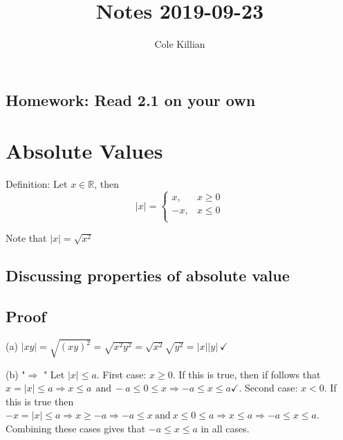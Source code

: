 \documentclass{article}
\begin{document}
\title{Notes 2019-09-23}
\author{Cole Killian}

\maketitle

\subsection{Homework: Read 2.1 on your own}

\section{Absolute Values}

Definition: Let $x \in \mathbb{R}$, then
\[|x| = 
  \begin{cases}
    x, & x \geq 0 \\
    -x, & x \leq 0 \\
  \end{cases}
\]

Note that $|x| = \sqrt{x^2}$

\subsection{Discussing properties of absolute value}


\subsection{Proof}

(a) $|xy| = \sqrt{(xy)^2} = \sqrt{x^2y^2} = \sqrt{x^2}\sqrt{y^2} = |x||y| \ \checkmark$

(b) "$\Rightarrow$ " Let $|x| \leq a$. First case: $x \geq 0$. If this is true, then if follows that $x = |x| \leq a \Rightarrow x \leq a \ \ \text{and} \ -a \leq 0 \leq x \Rightarrow -a \leq x \leq a \checkmark$. Second case: $x < 0$. If this is true then $-x = |x| \leq a \Rightarrow x \geq -a \Rightarrow -a \leq x \ \text{and} \ x \leq 0 \leq a \Rightarrow x \leq a \Rightarrow -a \leq x \leq a$. Combining these cases gives that $-a \leq x \leq a$ in all cases.
\end{document}
